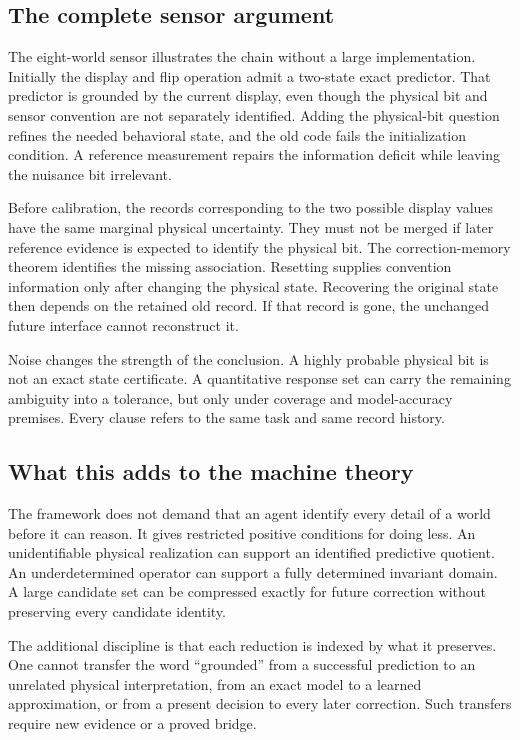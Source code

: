 \documentclass[11pt,letterpaper]{article}
\theoremstyle{plain}
\theoremstyle{definition}
\begin{document}
\subsection{The complete sensor argument}
The eight-world sensor illustrates the chain without a large implementation. Initially the display and flip operation admit a two-state exact predictor. That predictor is grounded by the current display, even though the physical bit and sensor convention are not separately identified. Adding the physical-bit question refines the needed behavioral state, and the old code fails the initialization condition. A reference measurement repairs the information deficit while leaving the nuisance bit irrelevant.

Before calibration, the records corresponding to the two possible display values have the same marginal physical uncertainty. They must not be merged if later reference evidence is expected to identify the physical bit. The correction-memory theorem identifies the missing association. Resetting supplies convention information only after changing the physical state. Recovering the original state then depends on the retained old record. If that record is gone, the unchanged future interface cannot reconstruct it.

Noise changes the strength of the conclusion. A highly probable physical bit is not an exact state certificate. A quantitative response set can carry the remaining ambiguity into a tolerance, but only under coverage and model-accuracy premises. Every clause refers to the same task and same record history.

\subsection{What this adds to the machine theory}
The framework does not demand that an agent identify every detail of a world before it can reason. It gives restricted positive conditions for doing less. An unidentifiable physical realization can support an identified predictive quotient. An underdetermined operator can support a fully determined invariant domain. A large candidate set can be compressed exactly for future correction without preserving every candidate identity.

The additional discipline is that each reduction is indexed by what it preserves. One cannot transfer the word ``grounded'' from a successful prediction to an unrelated physical interpretation, from an exact model to a learned approximation, or from a present decision to every later correction. Such transfers require new evidence or a proved bridge.
\end{document}
